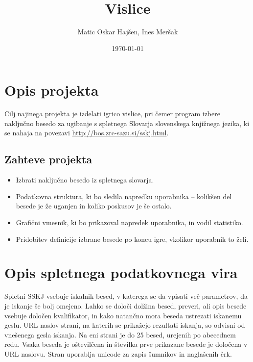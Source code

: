 \documentclass [a4paper, 12pt] {article}
\title {Vislice}
\author {Matic Oskar Hajšen, Ines Meršak}
\date {\today}
\begin{document}
\maketitle
\tableofcontents

\newpage

\section {Opis projekta}
Cilj najinega projekta je izdelati igrico vislice, pri čemer program izbere naključno besedo za ugibanje s spletnega Slovarja slovenskega knjižnega jezika, ki se nahaja na povezavi \url{http://bos.zrc-sazu.si/sskj.html}.
\subsection {Zahteve projekta}
\begin {itemize}
\item Izbrati naključno besedo iz spletnega slovarja.
\item Podatkovna struktura, ki bo sledila napredku uporabnika -- kolikšen del besede je že uganjen in koliko poskusov je še ostalo.
\item Grafični vmesnik, ki bo prikazoval napredek uporabnika, in vodil statistiko.
\item  Pridobitev definicije izbrane besede po koncu igre, vkolikor uporabnik to želi.
\end {itemize}

\section {Opis spletnega podatkovnega vira}
Spletni SSKJ vsebuje iskalnik besed, v katerega se da vpisati več parametrov, da je iskanje še bolj omejeno. Lahko se določi dolžina besed, preveri, ali opis besede vsebuje določen kvalifikator, in kako natančno mora beseda ustrezati iskanemu geslu. URL naslov strani, na katerih se prikažejo rezultati iskanja, so odvisni od vnešenega gesla iskanja. Na eni strani je do 25 besed, urejenih po abecednem redu. Vsaka beseda je oštevilčena in številka prve prikazane besede je določena v URL naslovu. Stran uporablja unicode za zapis šumnikov in naglašenih črk.
\end{document}
